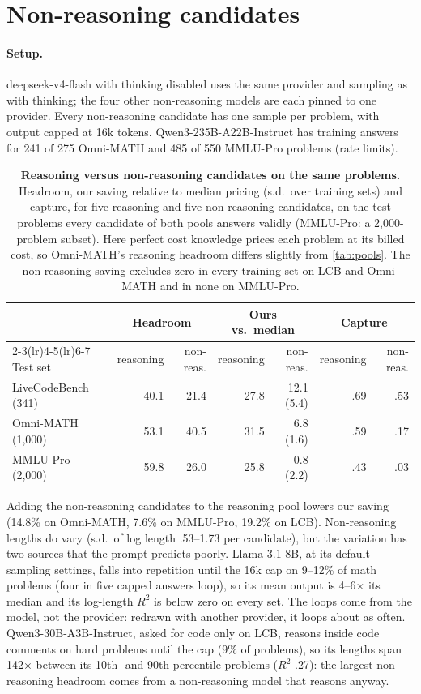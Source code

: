 \documentclass[10pt]{article}
\begin{document}
\FloatBarrier
\section{Non-reasoning candidates}\label{app:nonreason}
\paragraph{Setup.} deepseek-v4-flash with thinking disabled uses the same provider and sampling as with thinking; the four other non-reasoning models are each pinned to one provider. Every non-reasoning candidate has one sample per problem, with output capped at 16k tokens. Qwen3-235B-A22B-Instruct has training answers for 241 of 275 Omni-MATH and 485 of 550 MMLU-Pro problems (rate limits).
\begin{table}[h]
\centering
\footnotesize
\setlength{\tabcolsep}{4pt}
\begin{tabular}{lrrrrrr}
\toprule
 & \multicolumn{2}{c}{Headroom} & \multicolumn{2}{c}{Ours vs.\ median} & \multicolumn{2}{c}{Capture} \\
\cmidrule(lr){2-3}\cmidrule(lr){4-5}\cmidrule(lr){6-7}
Test set & reasoning & non-reas. & reasoning & non-reas. & reasoning & non-reas. \\
\midrule
LiveCodeBench (341) & 40.1 & 21.4 & 27.8 & 12.1 (5.4) & .69 & .53 \\
Omni-MATH (1,000) & 53.1 & 40.5 & 31.5 & 6.8 (1.6) & .59 & .17 \\
MMLU-Pro (2,000) & 59.8 & 26.0 & 25.8 & 0.8 (2.2) & .43 & .03 \\
\bottomrule
\end{tabular}
\caption{\textbf{Reasoning versus non-reasoning candidates on the same problems.} Headroom, our saving relative to median pricing (s.d.\ over training sets) and capture, for five reasoning and five non-reasoning candidates, on the test problems every candidate of both pools answers validly (MMLU-Pro: a 2,000-problem subset). Here perfect cost knowledge prices each problem at its billed cost, so Omni-MATH's reasoning headroom differs slightly from \cref{tab:pools}. The non-reasoning saving excludes zero in every training set on LCB and Omni-MATH and in none on MMLU-Pro.}
\label{tab:nonreason}
\end{table}
Adding the non-reasoning candidates to the reasoning pool lowers our saving (14.8\% on Omni-MATH, 7.6\% on MMLU-Pro, 19.2\% on LCB). Non-reasoning lengths do vary (s.d.\ of log length .53--1.73 per candidate), but the variation has two sources that the prompt predicts poorly. Llama-3.1-8B, at its default sampling settings, falls into repetition until the 16k cap on 9--12\% of math problems (four in five capped answers loop), so its mean output is 4--6$\times$ its median and its log-length $R^2$ is below zero on every set. The loops come from the model, not the provider: redrawn with another provider, it loops about as often. Qwen3-30B-A3B-Instruct, asked for code only on LCB, reasons inside code comments on hard problems until the cap (9\% of problems), so its lengths span 142$\times$ between its 10th- and 90th-percentile problems ($R^2$ .27): the largest non-reasoning headroom comes from a non-reasoning model that reasons anyway.
\end{document}
